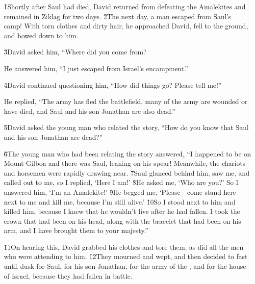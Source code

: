 


\v{1}Shortly after Saul had died, David returned from defeating the Amalekites and remained in Ziklag for two days. \v{2}The next day, a man escaped from Saul's camp! With torn clothes and dirty hair, he approached David, fell to the ground, and bowed down to him.

\v{3}David asked him, ``Where did you come from?

He answered him, ``I just escaped from Israel's encampment.''

\v{4}David continued questioning him, ``How did things go? Please tell me!''

He replied, ``The army has fled the battlefield, many of the army are wounded or have died, and Saul and his son Jonathan are also dead.''

\v{5}David asked the young man who related the story, ``How do you know that Saul and his son Jonathan are dead?''

\v{6}The young man who had been relating the story answered, ``I happened to be on Mount Gilboa and there was Saul, leaning on his spear! Meanwhile, the chariots and horsemen were rapidly drawing near. \v{7}Saul glanced behind him, saw me, and called out to me, so I replied, `Here I am!' \v{8}He asked me, `Who are you?' So I answered him, `I'm an Amalekite!' \v{9}He begged me, `Please---come stand here next to me and kill me, because I'm still alive.' \v{10}So I stood next to him and killed him, because I knew that he wouldn't live after he had fallen. I took the crown that had been on his head, along with the bracelet that had been on his arm, and I have brought them to your majesty.''

\v{11}On hearing this, David grabbed his clothes and tore them, as did all the men who were attending to him. \v{12}They mourned and wept, and then decided to fast until dusk for Saul, for his son Jonathan, for the army of the , and for the house of Israel, because they had fallen in battle.

